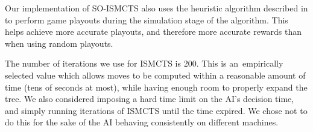 Our implementation of SO-ISMCTS also uses the heuristic algorithm
described in  to perform
game playouts during the simulation stage of the algorithm. This helps
achieve more accurate playouts, and therefore more accurate rewards
than when using random playouts.

The number of iterations we use for ISMCTS is 200. This is an~empirically
selected value which allows moves to be computed within a reasonable amount of time
(tens of seconds at most), while having enough room to properly expand
the tree. We also considered imposing a hard time limit on the AI's decision time,
and simply running iterations of ISMCTS until the time expired. We chose not to
do this for the sake of the AI behaving consistently on different machines.

